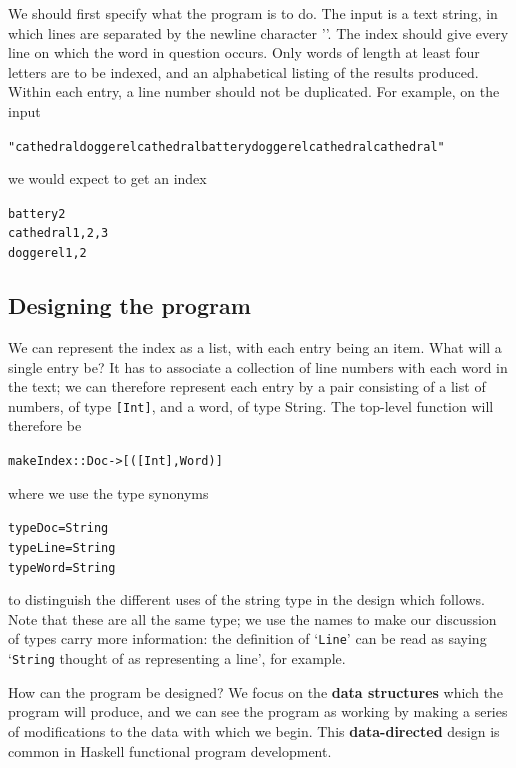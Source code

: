 We should first specify what the program is to do. The input is a text
string, in which lines are separated by the newline character {\mi
''}. The index should give every line on which the word in question
occurs. Only words of length at least four letters are to be indexed, and an
alphabetical listing of the results produced. Within each entry, a line number
should not be duplicated. For example, on the input 
\begin{alltt}
"cathedral doggerel cathedralbattery doggerel cathedralcathedral"
\end{alltt}
we would expect to get an index
\begin{alltt}
battery         2
cathedral       1, 2, 3
doggerel        1, 2
\end{alltt}

\subsection*{Designing the program}

We can represent the index as a list, with each entry being an item. What
will a single entry be? It has to associate a collection of line numbers with
each word in the text; we can therefore represent each entry by a pair
consisting of a list of numbers, of type \texttt{[Int]}, and a word, of type {\mi
String}. The top-level function will therefore be
\begin{alltt}
makeIndex :: Doc -> [ ([Int],Word) ]
\end{alltt}
where we use the type synonyms
\begin{alltt}
type Doc  = String
type Line = String
type Word = String
\end{alltt}
to distinguish the different uses of the string type in the design which
follows. Note that these are all the same type; we use the names to make
our discussion of types carry more information: the definition of `\texttt{Line}' can be
read as saying `\texttt{String} thought of as representing a
line', for example.

How can the program be designed? 
We focus on the {\bf data
structures} which the program will produce, and we can see the program as working 
by making a series of modifications to the data with which we begin. This {\bf
data-directed} design
is common in Haskell functional program development.

